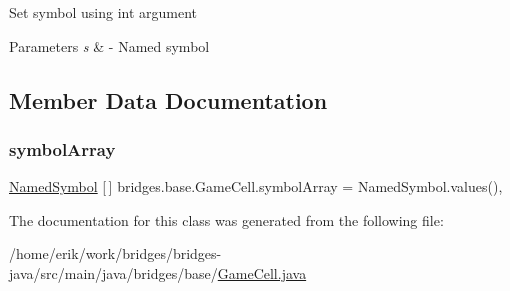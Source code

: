 Set symbol using int argument 
\begin{DoxyParams}{Parameters}
{\em s} & -\/ Named symbol \\
\hline
\end{DoxyParams}


\subsection{Member Data Documentation}
\mbox{\label{classbridges_1_1base_1_1_game_cell_a558b0696aebc6676780316714bf60e0d}} 
\subsubsection{\texorpdfstring{symbol\+Array}{symbolArray}}
{\footnotesize\ttfamily \hyperlink{enumbridges_1_1base_1_1_named_symbol}{Named\+Symbol} \mbox{[}$\,$\mbox{]} bridges.\+base.\+Game\+Cell.\+symbol\+Array = Named\+Symbol.\+values()\hspace{0.3cm}{\ttfamily [static]}, {\ttfamily [protected]}}



The documentation for this class was generated from the following file\+:\begin{DoxyCompactItemize}
\item 
/home/erik/work/bridges/bridges-\/java/src/main/java/bridges/base/\hyperlink{_game_cell_8java}{Game\+Cell.\+java}\end{DoxyCompactItemize}
